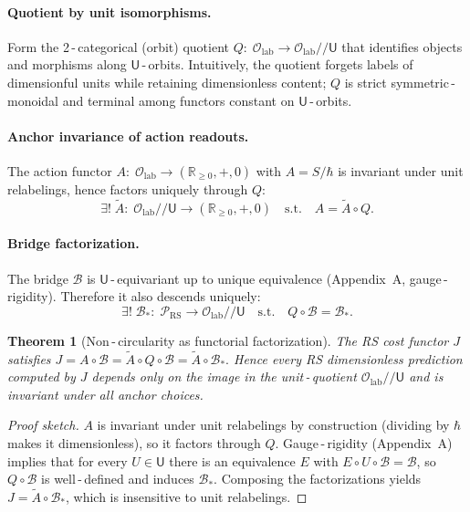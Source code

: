 \documentclass[11pt]{article}
\newcommand{\RR}{\mathbb{R}}
\newtheorem{theorem}{Theorem}[section]
\theoremstyle{remark}
\begin{document}
\paragraph{Quotient by unit isomorphisms.}
Form the 2\,\mbox{-}\,categorical (orbit) quotient $Q:\;\mathcal O_{\mathrm{lab}}\to \mathcal O_{\mathrm{lab}}/\!\!/\mathsf U$
that identifies objects and morphisms along $\mathsf U$\,\mbox{-}\,orbits. Intuitively, the quotient
forgets labels of dimensionful units while retaining dimensionless content;
$Q$ is strict symmetric\,\mbox{-}\,monoidal and terminal among functors constant on $\mathsf U$\,\mbox{-}\,orbits.

\paragraph{Anchor invariance of action readouts.}
The action functor $A:\; \mathcal O_{\mathrm{lab}}\to (\RR_{\ge 0},+,0)$ with $A=S/\hbar$ is invariant under
unit relabelings, hence factors uniquely through $Q$:
\[
  \exists !\; \widetilde A:\; \mathcal O_{\mathrm{lab}}/\!\!/\mathsf U\to (\RR_{\ge 0},+,0)
  \quad\text{s.t.}\quad A = \widetilde A\circ Q.
\]

\paragraph{Bridge factorization.}
The bridge $\mathcal B$ is $\mathsf U$\,\mbox{-}\,equivariant up to unique equivalence (Appendix~A,
gauge\,\mbox{-}\,rigidity). Therefore it also descends uniquely:
\[
  \exists !\; \mathcal B_{\!*}:\; \mathcal P_{\mathrm{RS}}\to \mathcal O_{\mathrm{lab}}/\!\!/\mathsf U
  \quad\text{s.t.}\quad Q\circ \mathcal B = \mathcal B_{\!*}.
\]

\begin{theorem}[Non\,\mbox{-}\,circularity as functorial factorization]
The RS cost functor $J$ satisfies
\(
  J = A\circ \mathcal B = \widetilde A\circ Q \circ \mathcal B = \widetilde A\circ \mathcal B_{\!*}.
\)
Hence every RS dimensionless prediction computed by $J$ depends only on the image in the
unit\,\mbox{-}\,quotient $\mathcal O_{\mathrm{lab}}/\!\!/\mathsf U$ and is invariant under all anchor choices.
\end{theorem}

\begin{proof}[Proof sketch]
$A$ is invariant under unit relabelings by construction (dividing by $\hbar$ makes it
dimensionless), so it factors through $Q$. Gauge\,\mbox{-}\,rigidity (Appendix~A) implies that for every
$U\in\mathsf U$ there is an equivalence $E$ with $E\circ U\circ \mathcal B = \mathcal B$, so $Q\circ \mathcal B$
is well\,\mbox{-}\,defined and induces $\mathcal B_{\!*}$. Composing the factorizations yields
$J=\widetilde A\circ \mathcal B_{\!*}$, which is insensitive to unit relabelings.\qedhere
\end{proof}
\end{document}
